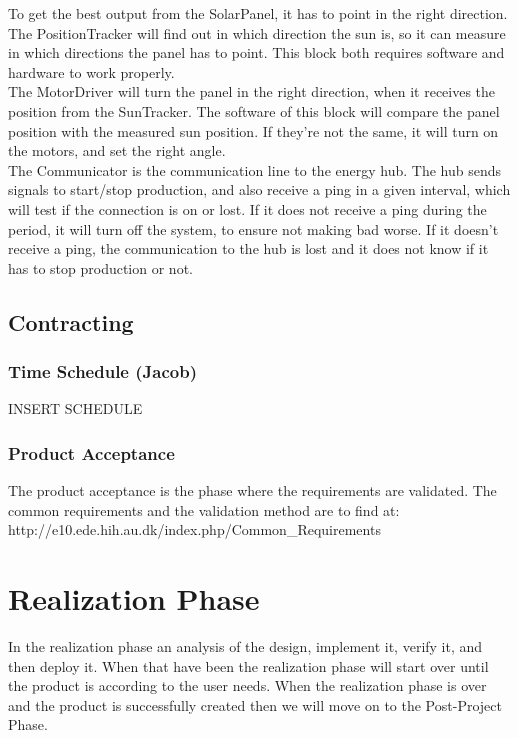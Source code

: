 \documentclass[12pt,a4paper]{report}
\begin{document}
To get the best output from the SolarPanel, it has to point in the right direction. The PositionTracker will find out in which direction the sun is, so it can measure in which directions the panel has to point. This block both requires software and hardware to work properly.\\

The MotorDriver will turn the panel in the right direction, when it receives the position from the SunTracker. The software of this block will compare the panel position with the measured sun position. If they’re not the same, it will turn on the motors, and set the right angle.\\

The Communicator is the communication line to the energy hub. The hub sends signals to start/stop production, and also receive a ping in a given interval, which will test if the connection is on or lost. If it does not receive a ping during the period, it will turn off the system, to ensure not making bad worse. If it doesn’t receive a ping, the communication to the hub is lost and it does not know if it has to stop production or not.\\


\subsection{Contracting}

\subsubsection{Time Schedule (Jacob)}

INSERT SCHEDULE

\subsubsection{Product Acceptance}
The product acceptance is the phase where the requirements are validated. The common requirements and the validation method are to find at:\\
http://e10.ede.hih.au.dk/index.php/Common\_Requirements
\\

\section{Realization Phase}
In the realization phase an analysis of the design, implement it, verify it, and then deploy it. When that have been the realization phase will start over until the product is according to the user needs.  When the realization phase is over and the product is successfully created then we will move on to the Post-Project Phase.\\
\end{document}
